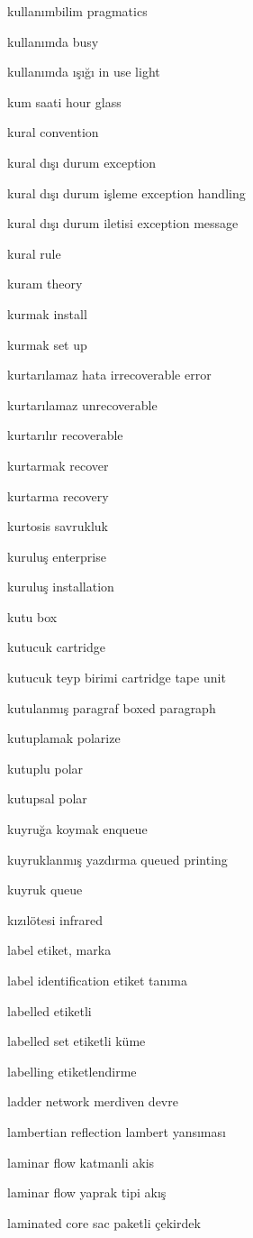 \documentclass[12pt,fleqn]{article}\usepackage{../../common}
\begin{document}
kullanımbilim pragmatics

kullanımda busy

kullanımda ışığı in use light

kum saati hour glass

kural convention

kural dışı durum exception

kural dışı durum işleme exception handling

kural dışı durum iletisi exception message

kural rule

kuram theory

kurmak install

kurmak set up

kurtarılamaz hata irrecoverable error

kurtarılamaz unrecoverable

kurtarılır recoverable

kurtarmak recover

kurtarma recovery

kurtosis savrukluk

kuruluş enterprise

kuruluş installation

kutu box

kutucuk cartridge

kutucuk teyp birimi cartridge tape unit

kutulanmış paragraf boxed paragraph

kutuplamak polarize

kutuplu polar

kutupsal polar

kuyruğa koymak enqueue

kuyruklanmış yazdırma queued printing

kuyruk queue

kızılötesi infrared

label etiket, marka

label identification etiket tanıma

labelled etiketli

labelled set etiketli küme

labelling etiketlendirme

ladder network merdiven devre

lambertian reflection lambert yansıması

laminar flow katmanli akis

laminar flow yaprak tipi akış

laminated core sac paketli çekirdek
\end{document}
